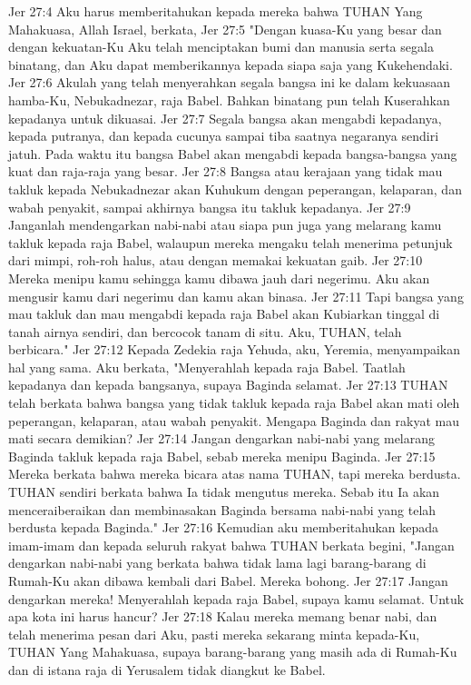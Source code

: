 Jer 27:4  Aku harus memberitahukan kepada mereka bahwa TUHAN Yang Mahakuasa, Allah Israel, berkata,
Jer 27:5  "Dengan kuasa-Ku yang besar dan dengan kekuatan-Ku Aku telah menciptakan bumi dan manusia serta segala binatang, dan Aku dapat memberikannya kepada siapa saja yang Kukehendaki.
Jer 27:6  Akulah yang telah menyerahkan segala bangsa ini ke dalam kekuasaan hamba-Ku, Nebukadnezar, raja Babel. Bahkan binatang pun telah Kuserahkan kepadanya untuk dikuasai.
Jer 27:7  Segala bangsa akan mengabdi kepadanya, kepada putranya, dan kepada cucunya sampai tiba saatnya negaranya sendiri jatuh. Pada waktu itu bangsa Babel akan mengabdi kepada bangsa-bangsa yang kuat dan raja-raja yang besar.
Jer 27:8  Bangsa atau kerajaan yang tidak mau takluk kepada Nebukadnezar akan Kuhukum dengan peperangan, kelaparan, dan wabah penyakit, sampai akhirnya bangsa itu takluk kepadanya.
Jer 27:9  Janganlah mendengarkan nabi-nabi atau siapa pun juga yang melarang kamu takluk kepada raja Babel, walaupun mereka mengaku telah menerima petunjuk dari mimpi, roh-roh halus, atau dengan memakai kekuatan gaib.
Jer 27:10  Mereka menipu kamu sehingga kamu dibawa jauh dari negerimu. Aku akan mengusir kamu dari negerimu dan kamu akan binasa.
Jer 27:11  Tapi bangsa yang mau takluk dan mau mengabdi kepada raja Babel akan Kubiarkan tinggal di tanah airnya sendiri, dan bercocok tanam di situ. Aku, TUHAN, telah berbicara."
Jer 27:12  Kepada Zedekia raja Yehuda, aku, Yeremia, menyampaikan hal yang sama. Aku berkata, "Menyerahlah kepada raja Babel. Taatlah kepadanya dan kepada bangsanya, supaya Baginda selamat.
Jer 27:13  TUHAN telah berkata bahwa bangsa yang tidak takluk kepada raja Babel akan mati oleh peperangan, kelaparan, atau wabah penyakit. Mengapa Baginda dan rakyat mau mati secara demikian?
Jer 27:14  Jangan dengarkan nabi-nabi yang melarang Baginda takluk kepada raja Babel, sebab mereka menipu Baginda.
Jer 27:15  Mereka berkata bahwa mereka bicara atas nama TUHAN, tapi mereka berdusta. TUHAN sendiri berkata bahwa Ia tidak mengutus mereka. Sebab itu Ia akan menceraiberaikan dan membinasakan Baginda bersama nabi-nabi yang telah berdusta kepada Baginda."
Jer 27:16  Kemudian aku memberitahukan kepada imam-imam dan kepada seluruh rakyat bahwa TUHAN berkata begini, "Jangan dengarkan nabi-nabi yang berkata bahwa tidak lama lagi barang-barang di Rumah-Ku akan dibawa kembali dari Babel. Mereka bohong.
Jer 27:17  Jangan dengarkan mereka! Menyerahlah kepada raja Babel, supaya kamu selamat. Untuk apa kota ini harus hancur?
Jer 27:18  Kalau mereka memang benar nabi, dan telah menerima pesan dari Aku, pasti mereka sekarang minta kepada-Ku, TUHAN Yang Mahakuasa, supaya barang-barang yang masih ada di Rumah-Ku dan di istana raja di Yerusalem tidak diangkut ke Babel.
